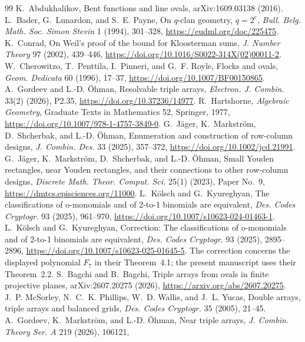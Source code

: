 \documentclass[11pt]{article}
\theoremstyle{definition}\newtheorem{definition}[theorem]{Definition}
\theoremstyle{remark}\newtheorem{remark}[theorem]{Remark}
\begin{document}
\begin{thebibliography}{99}
K.~Abdukhalikov, Bent functions and line ovals, arXiv:1609.03138 (2016).
L.~Bader, G.~Lunardon, and S.~E. Payne,
On \(q\)-clan geometry, \(q=2^e\),
\emph{Bull. Belg. Math. Soc. Simon Stevin} 1 (1994), 301--328,
\url{https://eudml.org/doc/225475}.
K.~Conrad, On Weil's proof of the bound for Kloosterman sums,
\emph{J. Number Theory} 97 (2002), 439--446,
\url{https://doi.org/10.1016/S0022-314X(02)00011-2}.
W.~Cherowitzo, T.~Penttila, I.~Pinneri, and G.~F. Royle,
Flocks and ovals, \emph{Geom. Dedicata} 60 (1996), 17--37,
\url{https://doi.org/10.1007/BF00150865}.
A.~Gordeev and L.-D. Öhman, Resolvable triple arrays,
\emph{Electron. J. Combin.} 33(2) (2026), P2.35,
\url{https://doi.org/10.37236/14977}.
R.~Hartshorne, \emph{Algebraic Geometry}, Graduate Texts in Mathematics 52,
Springer, 1977,
\url{https://doi.org/10.1007/978-1-4757-3849-0}.
G.~Jäger, K.~Markström, D.~Shcherbak, and L.-D. Öhman,
Enumeration and construction of row-column designs,
\emph{J. Combin. Des.} 33 (2025), 357--372,
\url{https://doi.org/10.1002/jcd.21991}.
G.~J\"ager, K.~Markstr\"om, D.~Shcherbak, and L.-D. \"Ohman,
Small Youden rectangles, near Youden rectangles, and their connections to
other row-column designs,
\emph{Discrete Math. Theor. Comput. Sci.} 25(1) (2023), Paper No.~9,
\url{https://dmtcs.episciences.org/11000}.
L.~Kölsch and G.~Kyureghyan,
The classifications of o-monomials and of 2-to-1 binomials are equivalent,
\emph{Des. Codes Cryptogr.} 93 (2025), 961--970,
\url{https://doi.org/10.1007/s10623-024-01463-1}.
L.~Kölsch and G.~Kyureghyan,
Correction: The classifications of o-monomials and of 2-to-1 binomials are
equivalent,
\emph{Des. Codes Cryptogr.} 93 (2025), 2895--2896,
\url{https://doi.org/10.1007/s10623-025-01645-5}.
The correction concerns the displayed polynomial \(F_7\) in their
Theorem~4.1; the present manuscript uses their Theorem~2.2.
S.~Bagchi and B.~Bagchi,
Triple arrays from ovals in finite projective planes,
arXiv:2607.20275 (2026),
\url{https://arxiv.org/abs/2607.20275}.
J.~P. McSorley, N.~C.~K. Phillips, W.~D. Wallis, and J.~L. Yucas,
Double arrays, triple arrays and balanced grids,
\emph{Des. Codes Cryptogr.} 35 (2005), 21--45.
A.~Gordeev, K.~Markstr\"om, and L.-D. Öhman,
Near triple arrays, \emph{J. Combin. Theory Ser. A} 219 (2026), 106121,

\end{thebibliography}
\end{document}
